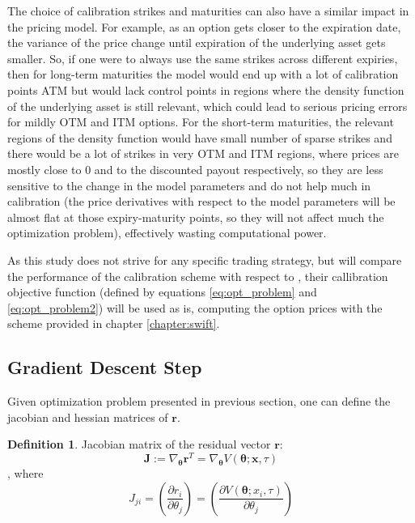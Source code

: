 \documentclass[12,twoside]{mammeTFM}
\theoremstyle{definition}
\newtheorem{definition}[thm]{Definition}
\theoremstyle{remark}
\begin{document}
The choice of calibration strikes and maturities can also have a similar impact in the pricing model. For example, as an option gets closer to the expiration date, the variance of the price change until expiration of the underlying asset gets smaller. So, if one were to always use the same strikes across different expiries, then for long-term maturities the model would end up with a lot of calibration points ATM but would lack control points in regions where the density function of the underlying asset is still relevant, which could lead to serious pricing errors for mildly OTM and ITM options. For the short-term maturities, the relevant regions of the density function would have small number of sparse strikes and there would be a lot of strikes in very OTM and ITM regions, where prices are mostly close to 0 and to the discounted payout respectively, so they are less sensitive to the change in the model parameters and do not help much in calibration (the price derivatives with respect to the model parameters will be almost flat at those expiry-maturity points, so they will not affect much the optimization problem), effectively wasting computational power.

As this study does not strive for any specific trading strategy, but will compare the performance of the calibration scheme with respect to \cite{cui17}, their callibration objective function (defined by equations \ref{eq:opt_problem} and \ref{eq:opt_problem2}) will be used as is, computing the option prices with the scheme provided in chapter \ref{chapter:swift}.

\subsection{Gradient Descent Step} \label{sec:gradient}

Given optimization problem presented in previous section, one can define the jacobian and hessian matrices of $\boldsymbol{r}$.

\begin{definition} Jacobian matrix of the residual vector $\boldsymbol{r}$:
\begin{equation}
\boldsymbol{J} := \nabla_{\boldsymbol{\theta}} \boldsymbol{r}^T = \nabla_{\boldsymbol{\theta}} V(\boldsymbol{\theta}; \boldsymbol{x}, \tau)
\end{equation}
, where
\begin{equation}
J_{ji} = \left(\dfrac{\partial r_i}{\partial \theta_j} \right) = \left(\dfrac{\partial V(\boldsymbol{\theta}; x_i, \tau)}{\partial \theta_j} \right)
\end{equation}
\end{definition}
\end{document}
